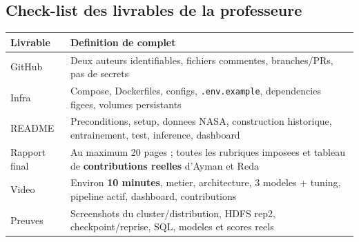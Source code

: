 \documentclass[10pt,a4paper]{article}
\newcommand{\code}[1]{{\small\ttfamily\nolinkurl{#1}}}
\begin{document}
\subsection{Check-list des livrables de la professeure}
\begin{tabularx}{\linewidth}{@{}p{46mm}Y@{}}
\toprule
\textbf{Livrable} & \textbf{Definition de complet}\\\midrule
GitHub & Deux auteurs identifiables, fichiers commentes, branches/PRs, pas de secrets\\
Infra & Compose, Dockerfiles, configs, \code{.env.example}, dependencies figees, volumes persistants\\
README & Preconditions, setup, donnees NASA, construction historique, entrainement, test, inference, dashboard\\
Rapport final & Au maximum 20 pages ; toutes les rubriques imposees et tableau de \textbf{contributions reelles} d'Ayman et Reda\\
Video & Environ \textbf{10 minutes}, metier, architecture, 3 modeles + tuning, pipeline actif, dashboard, contributions\\
Preuves & Screenshots du cluster/distribution, HDFS rep2, checkpoint/reprise, SQL, modeles et scores reels\\
\bottomrule
\end{tabularx}
\end{document}
